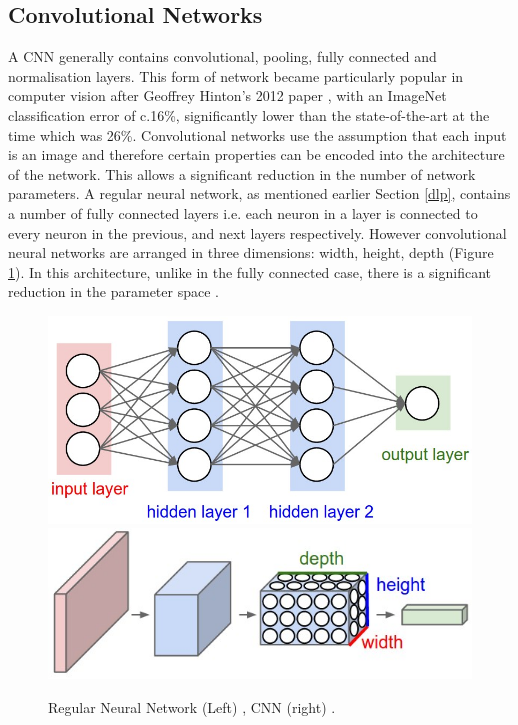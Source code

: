 \documentclass[11pt,twoside]{report}
\begin{document}
\subsection{Convolutional Networks} \label{Cnn_section}
A CNN generally contains convolutional, pooling, fully connected and normalisation layers. This form of network became particularly popular in computer vision after Geoffrey Hinton's 2012 paper \cite{GH_CNN}, with an ImageNet classification error of c.16\%, significantly lower than the state-of-the-art at the time which was 26\%. Convolutional networks use the assumption that each input is an image and therefore certain properties can be encoded into the architecture of the network. This allows a significant reduction in the number of network parameters.
\newline \newline
A regular neural network, as mentioned earlier Section \ref{dlp}, contains a number of fully connected layers i.e. each neuron in a layer is connected to every neuron in the previous, and next layers respectively. However convolutional neural networks are arranged in three dimensions: width, height, depth (Figure \ref{CNNvsNN}). In this architecture, unlike in the fully connected case, there is a significant reduction in the parameter space \cite{StanfordCS231_1}.

\noindent \begin{figure}[h!]
	\includegraphics[width = 0.5\hsize]{./figures/neural_net2.jpeg}
	\includegraphics[width = 0.5\hsize]{./figures/cnn.jpeg}
	\caption{Regular Neural Network (Left) \cite{StanfordCS231_1} , CNN (right) \cite{StanfordCS231_1}.}
	\label{CNNvsNN}
\end{figure}
\end{document}
